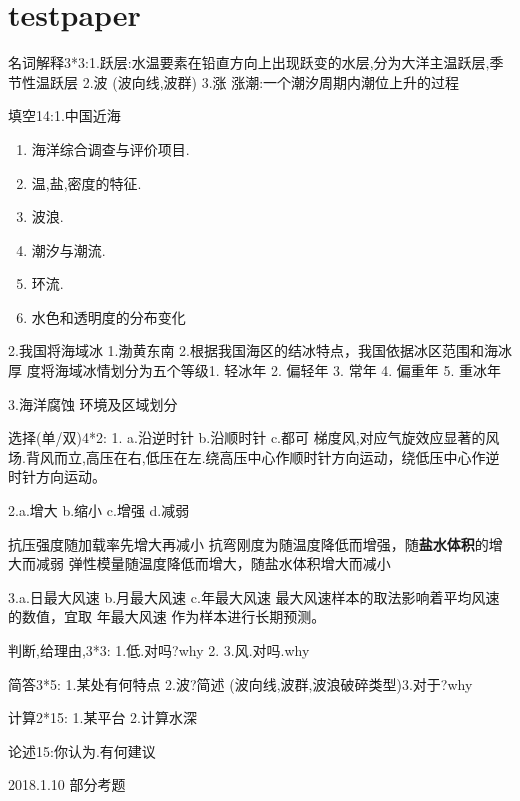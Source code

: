 \section{testpaper}
名词解释3*3:1.跃层:水温要素在铅直方向上出现跃变的水层,分为大洋主温跃层,季节性温跃层  2.波 (波向线,波群) 3.涨 涨潮:一个潮汐周期内潮位上升的过程

填空14:1.中国近海 
		\begin{enumerate}
			\item 海洋综合调查与评价项目. 
			\item 温,盐,密度的特征. 
			\item 波浪.
			\item 潮汐与潮流. 
			\item 环流. 
			\item 水色和透明度的分布变化
		\end{enumerate}

2.我国将海域冰 
	 1.渤黄东南
	 2.根据我国海区的结冰特点，我国依据冰区范围和海冰厚
	 度将海域冰情划分为五个等级1. 轻冰年
	 2. 偏轻年
	 3. 常年
	 4. 偏重年
	 5. 重冰年

3.海洋腐蚀 环境及区域划分

选择(单/双)4*2: 
1. a.沿逆时针 b.沿顺时针 c.都可  
梯度风,对应气旋效应显著的风场.背风而立,高压在右,低压在左.绕高压中心作顺时针方向运动，绕低压中心作逆时针方向运动。

2.a.增大 b.缩小 c.增强 d.减弱  

抗压强度随加载率先增大再减小
抗弯刚度为随温度降低而增强，随\textbf{盐水体积}的增大而减弱
弹性模量随温度降低而增大，随盐水体积增大而减小

3.a.日最大风速 b.月最大风速 c.年最大风速
最大风速样本的取法影响着平均风速的数值，宜取 年最大风速 作为样本进行长期预测。

判断,给理由,3*3: 1.低.对吗?why 2.  3.风.对吗.why

简答3*5: 1.某处有何特点 2.波?简述 (波向线,波群,波浪破碎类型)3.对于?why

计算2*15: 1.某平台  2.计算水深

论述15:你认为.有何建议


2018.1.10 部分考题

